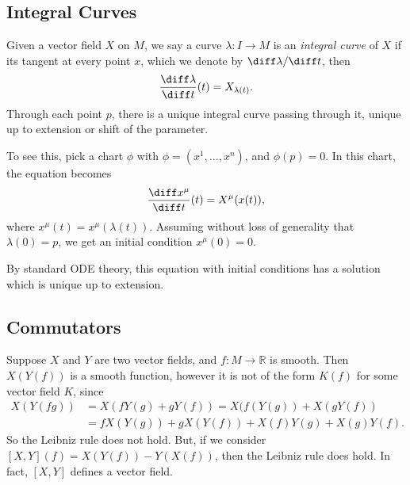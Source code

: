 \documentclass[12pt]{article}
\begin{document}
\subsection{Integral Curves}%
\label{sub:ic}

Given a vector field $X$ on $M$, we say a curve $\lambda : I \to M$ is an \emph{integral curve} of $X$ if its tangent at every point $x$, which we denote by $\diff \lambda/ \diff t$, then
\[
\frac{\diff \lambda}{\diff t} (t) = X_{\lambda(t)}.
\]
Through each point $p$, there is a unique integral curve passing through it, unique up to extension or shift of the parameter.

To see this, pick a chart $\phi$ with $\phi = (x^1, \ldots, x^n)$, and $\phi(p) = 0$. In this chart, the equation becomes
\[
\frac{\diff x^\mu}{\diff t}(t) = X^\mu(x(t)),
\]
where $x^\mu(t) = x^\mu(\lambda(t))$. Assuming without loss of generality that $\lambda(0) = p$, we get an initial condition $x^\mu(0)= 0$.

By standard ODE theory, this equation with initial conditions has a solution which is unique up to extension.

\subsection{Commutators}%
\label{sub:com}

Suppose $X$ and $Y$ are two vector fields, and $f : M \to \mathbb{R}$ is smooth. Then $X(Y(f))$ is a smooth function, however it is not of the form $K(f)$ for some vector field $K$, since
\begin{align*}
	X(Y(fg)) &= X(f Y(g) + g Y(f)) = X(f(Y(g)) + X(g Y(f)) \\
		 &= f X(Y(g)) + g X(Y(f)) + X(f) Y(g) + X(g) Y(f).
\end{align*}
So the Leibniz rule does not hold. But, if we consider $[X, Y](f) = X(Y(f)) - Y(X(f))$, then the Leibniz rule does hold. In fact, $[X, Y]$ defines a vector field.
\end{document}
